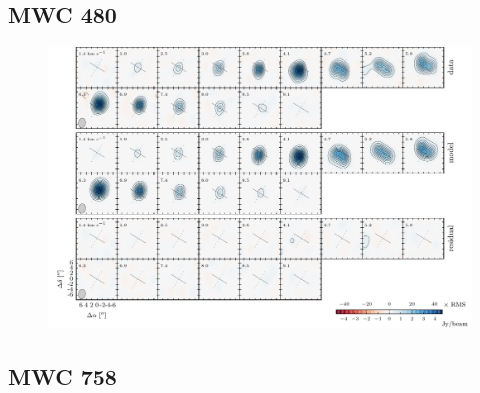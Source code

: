 \documentclass[twocolumn]{aastex6}
\begin{document}
\subsection{MWC 480}
\begin{figure}[htb]
\begin{center}
  \includegraphics{MWC480.pdf}
  \end{center}
\end{figure}

\subsection{MWC 758}
\end{document}
